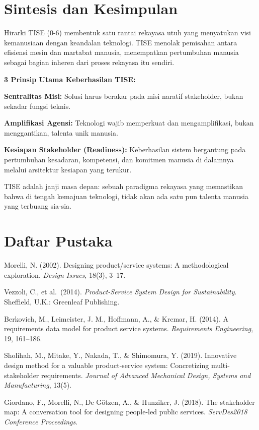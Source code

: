 \documentclass[
  letterpaper,
  DIV=11,
  numbers=noendperiod]{scrreprt}
\begin{document}
\section{Sintesis dan Kesimpulan}\label{sintesis-dan-kesimpulan}

Hirarki TISE (0-6) membentuk satu rantai rekayasa utuh yang menyatukan
visi kemanusiaan dengan keandalan teknologi. TISE menolak pemisahan
antara efisiensi mesin dan martabat manusia, menempatkan pertumbuhan
manusia sebagai bagian inheren dari proses rekayasa itu sendiri.

\textbf{3 Prinsip Utama Keberhasilan TISE:}

\textbf{Sentralitas Misi:} Solusi harus berakar pada misi naratif
stakeholder, bukan sekadar fungsi teknis.

\textbf{Amplifikasi Agensi:} Teknologi wajib memperkuat dan
mengamplifikasi, bukan menggantikan, talenta unik manusia.

\textbf{Kesiapan Stakeholder (Readiness):} Keberhasilan sistem
bergantung pada pertumbuhan kesadaran, kompetensi, dan komitmen manusia
di dalamnya melalui arsitektur kesiapan yang terukur.

TISE adalah janji masa depan: sebuah paradigma rekayasa yang memastikan
bahwa di tengah kemajuan teknologi, tidak akan ada satu pun talenta
manusia yang terbuang sia-sia.

\section{Daftar Pustaka}\label{daftar-pustaka}

Morelli, N. (2002). Designing product/service systems: A methodological
exploration. \emph{Design Issues}, 18(3), 3--17.

Vezzoli, C., et al.~(2014). \emph{Product-Service System Design for
Sustainability}. Sheffield, U.K.: Greenleaf Publishing.

Berkovich, M., Leimeister, J. M., Hoffmann, A., \& Krcmar, H. (2014). A
requirements data model for product service systems. \emph{Requirements
Engineering}, 19, 161--186.

Sholihah, M., Mitake, Y., Nakada, T., \& Shimomura, Y. (2019).
Innovative design method for a valuable product-service system:
Concretizing multi-stakeholder requirements. \emph{Journal of Advanced
Mechanical Design, Systems and Manufacturing}, 13(5).

Giordano, F., Morelli, N., De Götzen, A., \& Hunziker, J. (2018). The
stakeholder map: A conversation tool for designing people-led public
services. \emph{ServDes2018 Conference Proceedings}.
\end{document}
